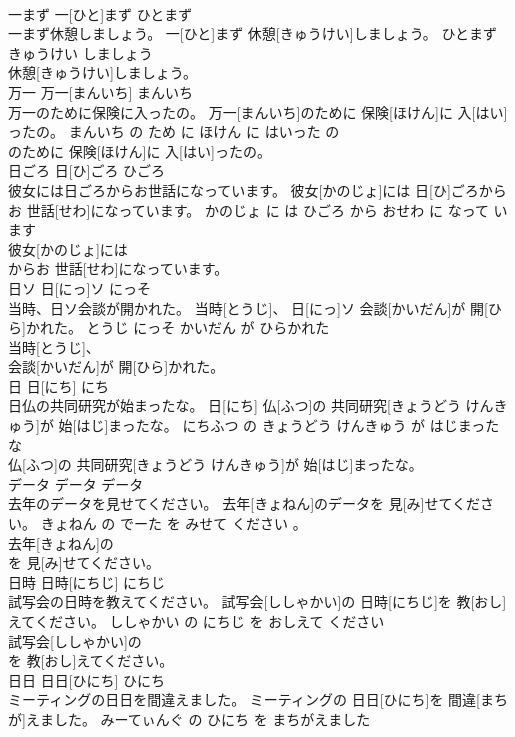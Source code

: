 \documentclass[8pt]{extreport}
\begin{document}
\begin{CJK}{UTF8}{min}
\\	一まず	一[ひと]まず	ひとまず	
\\	一まず休憩しましょう。	一[ひと]まず 休憩[きゅうけい]しましょう。	ひとまず きゅうけい しましょう	
\\	休憩[きゅうけい]しましょう。			
\\	万一	万一[まんいち]	まんいち	
\\	万一のために保険に入ったの。	万一[まんいち]のために 保険[ほけん]に 入[はい]ったの。	まんいち の ため に ほけん に はいった の	
\\	のために 保険[ほけん]に 入[はい]ったの。			
\\	日ごろ	日[ひ]ごろ	ひごろ	
\\	彼女には日ごろからお世話になっています。	彼女[かのじょ]には 日[ひ]ごろからお 世話[せわ]になっています。	かのじょ に は ひごろ から おせわ に なって います	
\\	彼女[かのじょ]には
\\	からお 世話[せわ]になっています。			
\\	日ソ	日[にっ]ソ	にっそ	
\\	当時、日ソ会談が開かれた。	当時[とうじ]、 日[にっ]ソ 会談[かいだん]が 開[ひら]かれた。	とうじ にっそ かいだん が ひらかれた	
\\	当時[とうじ]、
\\	会談[かいだん]が 開[ひら]かれた。			
\\	日	日[にち]	にち	
\\	日仏の共同研究が始まったな。	日[にち] 仏[ふつ]の 共同研究[きょうどう けんきゅう]が 始[はじ]まったな。	にちふつ の きょうどう けんきゅう が はじまった な	
\\	仏[ふつ]の 共同研究[きょうどう けんきゅう]が 始[はじ]まったな。			
\\	データ	データ	データ	
\\	去年のデータを見せてください。	去年[きょねん]のデータを 見[み]せてください。	きょねん の でーた を みせて ください 。	
\\	去年[きょねん]の
\\	を 見[み]せてください。			
\\	日時	日時[にちじ]	にちじ	
\\	試写会の日時を教えてください。	試写会[ししゃかい]の 日時[にちじ]を 教[おし]えてください。	ししゃかい の にちじ を おしえて ください	
\\	試写会[ししゃかい]の
\\	を 教[おし]えてください。			
\\	日日	日日[ひにち]	ひにち	
\\	ミーティングの日日を間違えました。	ミーティングの 日日[ひにち]を 間違[まちが]えました。	みーてぃんぐ の ひにち を まちがえました	

\end{CJK}
\end{document}
